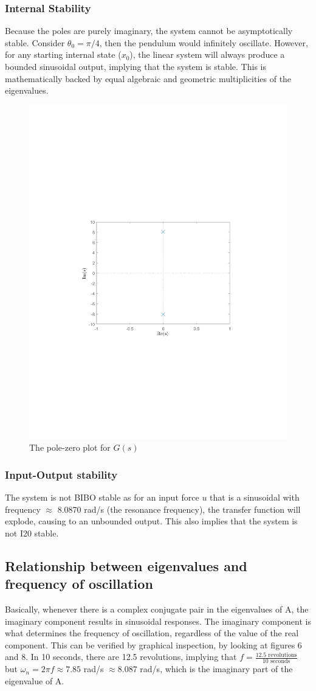 \documentclass[10pt]{article}
\begin{document}
\subsubsection{Internal Stability}
Because the poles are purely imaginary, the system cannot be asymptotically stable. Consider $\theta_0 = \pi/4$, then the pendulum would infinitely oscillate. However, for any starting internal state ($x_0$), the linear system will always produce a bounded sinusoidal output, implying that the system is stable. This is mathematically backed by equal algebraic and geometric multiplicities of the eigenvalues.

\begin{figure}[ht]
    \centering
        \includegraphics[clip, trim=4.3cm 8.3cm 4.5cm 9.3cm,width=0.45\linewidth]{lab1/figs/section6_pole_zero_gs.pdf}
        \caption{The pole-zero plot for $G(s)$}
\end{figure}

\subsubsection{Input-Output stability}
The system is not BIBO stable as for an input force $u$ that is a sinusoidal with frequency $\approx$ 8.0870 rad/s (the resonance frequency), the transfer function will explode, causing to an unbounded output. This also implies that the system is not I20 stable.

\subsection{Relationship between eigenvalues and frequency of oscillation}
Basically, whenever there is a complex conjugate pair in the eigenvalues of A, the imaginary component results in sinusoidal responses. The imaginary component is what determines the frequency of oscillation, regardless of the value of the real component. This can be verified by graphical inspection, by looking at figures 6 and 8. In 10 seconds, there are 12.5 revolutions, implying that $f = \frac{12.5 \text{ revolutions}}{10 \text{ seconds}}$ but $\omega_n = 2\pi f \approx 7.85$ rad/s $\approx 8.087$ rad/s, which is the imaginary part of the eigenvalue of A.
\end{document}
